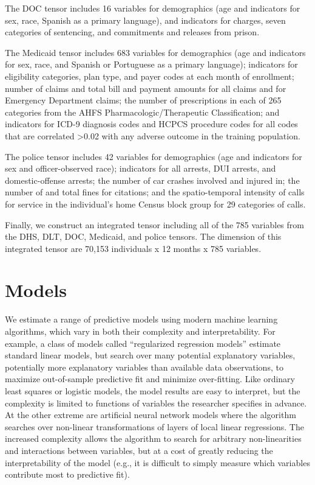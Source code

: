 \documentclass[9pt,twoside,lineno]{pnas-new}
\begin{document}
The DOC tensor includes 16 variables for demographics (age and indicators for sex, race, Spanish as a primary language), and indicators for charges, seven categories of sentencing, and commitments and releases from prison.

The Medicaid tensor includes 683 variables for demographics (age and indicators for sex, race, and Spanish or Portuguese as a primary language); indicators for eligibility categories, plan type, and payer codes at each month of enrollment; number of claims and total bill and payment amounts for all claims and for Emergency Department claims; the number of prescriptions in each of 265 categories from the AHFS Pharmacologic/Therapeutic Classification; and indicators for ICD-9 diagnosis codes and HCPCS procedure codes for all codes that are correlated >0.02 with any adverse outcome in the training population.

The police tensor includes 42 variables for demographics (age and indicators for sex and officer-observed race); indicators for all arrests, DUI arrests, and domestic-offense arrests; the number of car crashes involved and injured in; the number of and total fines for citations; and the spatio-temporal intensity of calls for service in the individual's home Census block group for 29 categories of calls.

Finally, we construct an integrated tensor including all of the 785 variables from the DHS, DLT, DOC, Medicaid, and police tensors. The dimension of this integrated tensor are 70,153 individuals x 12 months x 785 variables.

\section{Models}

We estimate a range of predictive models using modern machine learning algorithms, which vary in both their complexity and interpretability. For example, a class of models called ``regularized regression models'' estimate standard linear models, but search over many potential explanatory variables, potentially more explanatory variables than available data observations, to maximize out-of-sample predictive fit and minimize over-fitting. Like ordinary least squares or logistic models, the model results are easy to interpret, but the complexity is limited to functions of variables the researcher specifies in advance. At the other extreme are artificial neural network models where the algorithm searches over non-linear transformations of layers of local linear regressions. The increased complexity allows the algorithm to search for arbitrary non-linearities and interactions between variables, but at a cost of greatly reducing the interpretability of the model (e.g., it is difficult to simply measure which variables contribute most to predictive fit).
\end{document}
